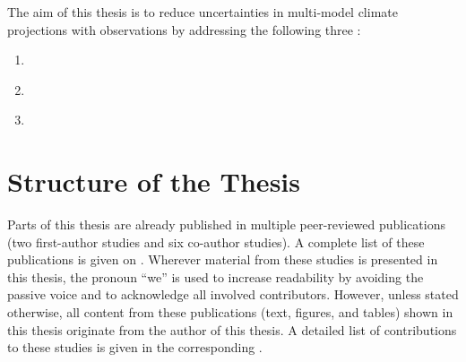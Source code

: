 The aim of this thesis is to reduce uncertainties in multi-model climate
projections with observations by addressing the following three
:

\begingroup
{}
\begin{enumerate}
  \item \label{enum:01:question_1} \KeyScienceQuestionOne{}
  \item \label{enum:01:question_2} \KeyScienceQuestionTwo{}
  \item \label{enum:01:question_3} \KeyScienceQuestionThree{}
\end{enumerate}
\endgroup


\section{Structure of the Thesis}
\label{sec:01:structure}

Parts of this thesis are already published in multiple peer-reviewed
publications (two first-author studies and six co-author studies). A complete
list of these publications is given on . Wherever material
from these studies is presented in this thesis, the pronoun \enquote{we} is
used to increase readability by avoiding the passive voice and to acknowledge
all involved contributors. However, unless stated otherwise, all content from
these publications (text, figures, and tables) shown in this thesis originate
from the author of this thesis. A detailed list of contributions to these
studies is given in the corresponding .

